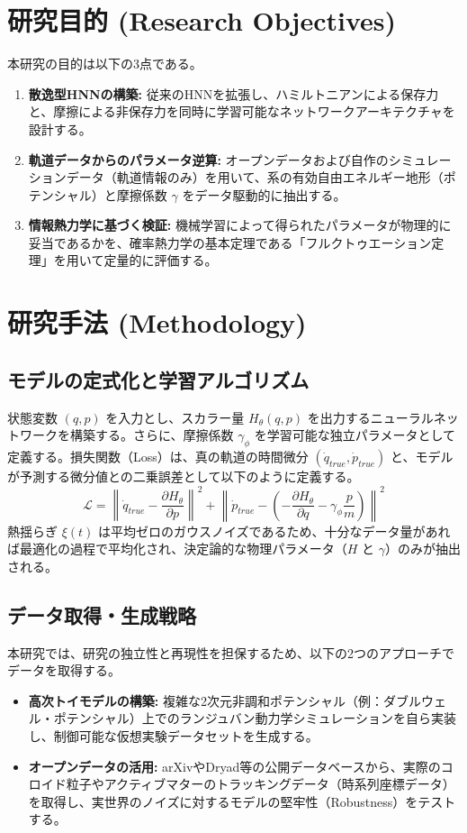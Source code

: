 \documentclass[a4paper,12pt]{jlreq}
\begin{document}
\section{研究目的 (Research Objectives)}
本研究の目的は以下の3点である。
\begin{enumerate}[label=\textbf{\arabic*.}]
    \item \textbf{散逸型HNNの構築:} 従来のHNNを拡張し、ハミルトニアンによる保存力と、摩擦による非保存力を同時に学習可能なネットワークアーキテクチャを設計する。
    \item \textbf{軌道データからのパラメータ逆算:} オープンデータおよび自作のシミュレーションデータ（軌道情報のみ）を用いて、系の有効自由エネルギー地形（ポテンシャル）と摩擦係数 $\gamma$ をデータ駆動的に抽出する。
    \item \textbf{情報熱力学に基づく検証:} 機械学習によって得られたパラメータが物理的に妥当であるかを、確率熱力学の基本定理である「フルクトゥエーション定理」を用いて定量的に評価する。
\end{enumerate}

\section{研究手法 (Methodology)}

\subsection{モデルの定式化と学習アルゴリズム}
状態変数 $(q, p)$ を入力とし、スカラー量 $H_{\theta}(q,p)$ を出力するニューラルネットワークを構築する。さらに、摩擦係数 $\gamma_{\phi}$ を学習可能な独立パラメータとして定義する。損失関数（Loss）は、真の軌道の時間微分 $(\dot{q}_{true}, \dot{p}_{true})$ と、モデルが予測する微分値との二乗誤差として以下のように定義する。
\begin{equation}
    \mathcal{L} = \left\| \dot{q}_{true} - \frac{\partial H_{\theta}}{\partial p} \right\|^2 + \left\| \dot{p}_{true} - \left( -\frac{\partial H_{\theta}}{\partial q} - \gamma_{\phi} \frac{p}{m} \right) \right\|^2
\end{equation}
熱揺らぎ $\xi(t)$ は平均ゼロのガウスノイズであるため、十分なデータ量があれば最適化の過程で平均化され、決定論的な物理パラメータ（$H$ と $\gamma$）のみが抽出される。

\subsection{データ取得・生成戦略}
本研究では、研究の独立性と再現性を担保するため、以下の2つのアプローチでデータを取得する。
\begin{itemize}
    \item \textbf{高次トイモデルの構築:} 複雑な2次元非調和ポテンシャル（例：ダブルウェル・ポテンシャル）上でのランジュバン動力学シミュレーションを自ら実装し、制御可能な仮想実験データセットを生成する。
    \item \textbf{オープンデータの活用:} arXivやDryad等の公開データベースから、実際のコロイド粒子やアクティブマターのトラッキングデータ（時系列座標データ）を取得し、実世界のノイズに対するモデルの堅牢性（Robustness）をテストする。
\end{itemize}
\end{document}
